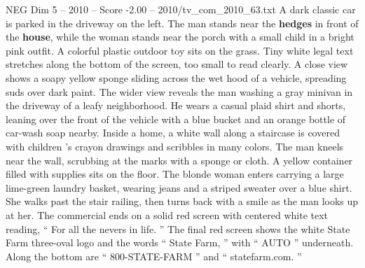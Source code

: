 \begin{textsample}{NEG Dim 5 – 2010 – Score -2.00 – 2010/tv\_com\_2010\_63.txt}
A dark classic car is parked in the driveway on the left.
The man stands near the \textbf{hedges} in front of the \textbf{house}, while the woman stands near the porch with a small child in a bright pink outfit.
A colorful plastic outdoor toy sits on the grass.
Tiny white legal text stretches along the bottom of the screen, too small to read clearly.
A close view shows a soapy yellow sponge sliding across the wet hood of a vehicle, spreading suds over dark paint.
The wider view reveals the man washing a gray minivan in the driveway of a leafy neighborhood.
He wears a casual plaid shirt and shorts, leaning over the front of the vehicle with a blue bucket and an orange bottle of car-wash soap nearby.
Inside a home, a white wall along a staircase is covered with children ’s crayon drawings and scribbles in many colors.
The man kneels near the wall, scrubbing at the marks with a sponge or cloth.
A yellow container filled with supplies sits on the floor.
The blonde woman enters carrying a large lime-green laundry basket, wearing jeans and a striped sweater over a blue shirt.
She walks past the stair railing, then turns back with a smile as the man looks up at her.
The commercial ends on a solid red screen with centered white text reading, “ For all the nevers in life. ” The final red screen shows the white State Farm three-oval logo and the words “ State Farm, ” with “ AUTO ” underneath.
Along the bottom are “ 800-STATE-FARM ” and “ statefarm.com. ”

\end{textsample}
